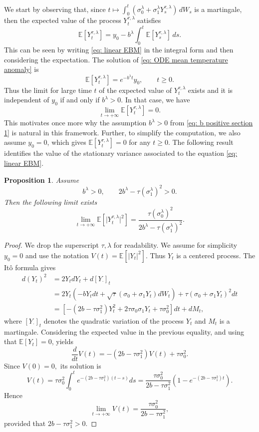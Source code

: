 \documentclass[10pt]{amsart}
\newtheorem{proposition}[theorem]{Proposition}
\numberwithin{equation}{section}
\begin{document}
We start by observing that, since $t \mapsto \int_0^t( \sigma_0^\lambda + \sigma_1^\lambda  Y_s ^{\tau,\lambda}) \, dW_s$ is a martingale, then the expected value of the process $Y_t ^{\tau,\lambda}$ satisfies 
\begin{equation}
\mathbb{E}[Y^{\tau,\lambda}_t]= y_0  -b^\lambda \int_0^t \mathbb{E}[Y^{\tau,\lambda}_s]\, ds.
\label{eq: ODE mean temperature anomaly}
\end{equation}
This can be seen by writing \eqref{eq: linear EBM} in the integral form and then considering the expectation. The solution of \eqref{eq: ODE mean temperature anomaly} is
$$
\mathbb{E}[ Y_t ^{\tau,\lambda}] = e^{-b^\lambda t}y_0, \qquad t \geq 0.
$$
Thus the limit for large time $t$ of the expected value of $Y_t^{\tau,\lambda}$ exists and it is independent of $y_0$ if and only if $ b^\lambda >0.$ In that case, we have
$$
\lim \limits_{t \to +\infty} \mathbb{E}[ Y_t^{\tau,\lambda}   ] = 0.
$$
This motivates once more why the assumption $b^\lambda >0$ from \eqref{eq: b positive section 1} is natural in this framework. Further, to simplify the computation, we also assume $y_0 = 0$, which gives $\mathbb{E}[Y_t^{\tau,\lambda}] = 0$ for any $ t\geq 0.$ The following result identifies the value of the stationary variance associated to the equation \eqref{eq: linear EBM}.
\begin{proposition}
\label{prop: stationary variance}
    Assume 
    $$
    b^\lambda >0,  \qquad  2b^\lambda - \tau (\sigma_1^\lambda )^2 >0.
    $$
    Then the following limit exists
    $$
    \lim \limits_{ t \to +\infty } \mathbb{E}[ \vert Y_t^{\tau,\lambda}  \vert ^2]=  \frac{\tau (\sigma_0^\lambda)^2}{2b^{\lambda}- \tau (\sigma_1^\lambda)^2}.
    $$
\end{proposition}
\begin{proof}
    We drop the superscript $\tau,\lambda $ for readability. We assume for simplicity $y_0 = 0$ and use the notation $V(t) = \mathbb{E}[ \vert Y_t \vert ^2]$. Thus $Y_t$ is a centered process. The It\^{o} formula gives
    \begin{equation}
        \begin{split}
            d(Y_t)^2 &= 2Y_t dY_t + d [Y_\cdot]_t\\ &= 2 Y_t \left(  - b Y_t dt + \sqrt{\tau}(\sigma_0 + \sigma_1Y_t) dW_t\right) + \tau (\sigma_0 + \sigma_1 Y_t)^2 dt\\
            &= \left[-(2b - \tau \sigma_1^2) Y_t^2  + 2 \tau \sigma_0 \sigma_1 Y_t  + \tau \sigma_0^2\right] dt + dM_t,
        \end{split}
    \end{equation}
    where $[Y_\cdot]_t$ denotes the quadratic variation of the process $Y_t$ and $M_t $ is a martingale. Considering the expected value in the previous equality, and using that $\mathbb{E}[Y_t] = 0 $, yields
    $$
    \frac{d}{dt} V(t) =  -(2b - \tau \sigma_1^2) V(t) + \tau \sigma_0^2.
$$
Since $V(0)=0,$ its solution is
$$
V(t) = \tau \sigma_0^2 \int_0^t e^{-(2b - \tau \sigma_1^2)(t-s)} ds = \frac{\tau \sigma_0^2}{2b - \tau \sigma_1^2} \left( 1 - e^{-(2b - \tau \sigma_1^2)t} \right).
$$
Hence
$$
\lim \limits_{t \to +\infty } V(t) = \frac{\tau \sigma_0^2}{ 2b - \tau \sigma_1^2},
$$
provided that $2b - \tau \sigma_1^2 >0$.
\end{proof}
\end{document}
